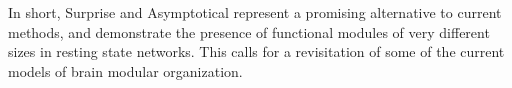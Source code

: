 In short, Surprise and Asymptotical represent a promising alternative to current methods, and demonstrate the presence of functional modules of very different sizes in resting state networks.
This calls for a revisitation of some of the current models of brain modular organization.

